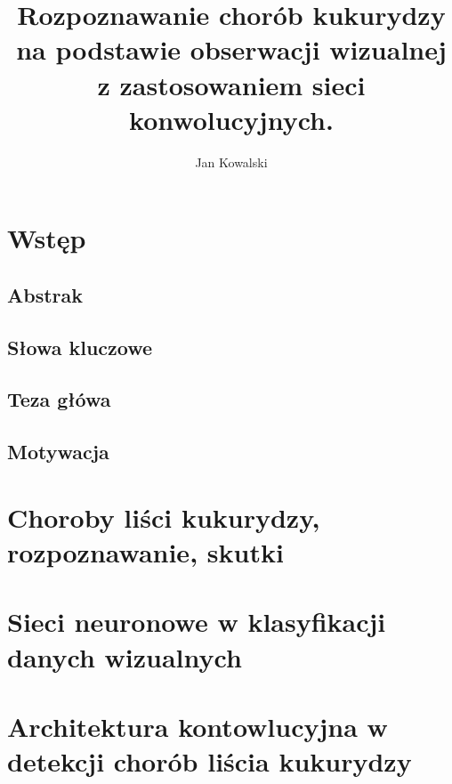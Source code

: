 \documentclass{article}
\title{Rozpoznawanie chorób kukurydzy na podstawie obserwacji wizualnej z zastosowaniem 
sieci konwolucyjnych.}
\author{Jan Kowalski}
\begin{document}
\maketitle
\tableofcontents

\section{Wstęp}

\subsection{Abstrak}

\subsection{Słowa kluczowe}

\subsection{Teza główa}

\subsection{Motywacja}



\section{Choroby liści kukurydzy, rozpoznawanie, skutki}

\section{Sieci neuronowe w klasyfikacji danych wizualnych}

\section{Architektura kontowlucyjna w detekcji chorób liścia kukurydzy}
\end{document}
